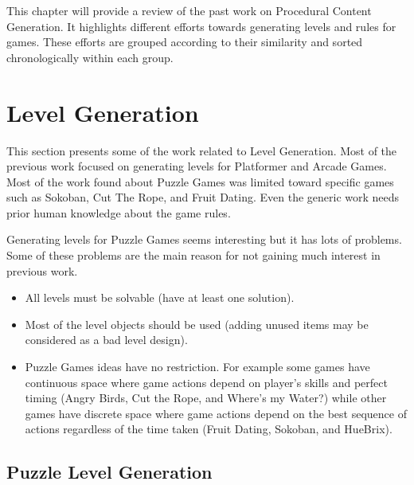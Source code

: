 This chapter will provide a review of the past work on Procedural Content Generation. It highlights different efforts towards generating levels and rules for games. These efforts are grouped according to their similarity and sorted chronologically within each group.

\section{Level Generation}
This section presents some of the work related to Level Generation. Most of the previous work focused on generating levels for Platformer and Arcade Games. Most of the work found about Puzzle Games was limited toward specific games such as Sokoban\cite{sokobanLevelGenerationNew, sokobanLevelGenerationOld}, Cut The Rope\cite{ctrSimulationApproach}, and Fruit Dating\cite{fruitDatingPCG}. Even the generic work needs prior human knowledge about the game rules\cite{ctrProgressiveApproach, ctrAutomaticGeneration}.\\\par

Generating levels for Puzzle Games seems interesting but it has lots of problems. Some of these problems are the main reason for not gaining much interest in previous work.
\begin{itemize} \itemsep0pt \parskip0pt 
	\item All levels must be solvable (have at least one solution).
	\item Most of the level objects should be used (adding unused items may be considered as a bad level design).
	\item Puzzle Games ideas have no restriction. For example some games have continuous space where game actions depend on player's skills and perfect timing (Angry Birds\cite{angryBirds}, Cut the Rope\cite{cutTheRope}, and Where's my Water?\cite{whereWater}) while other games have discrete space where game actions depend on the best sequence of actions regardless of the time taken (Fruit Dating\cite{fruitDating}, Sokoban\cite{sokoban}, and HueBrix\cite{hueBrix}).
\end{itemize}

\subsection{Puzzle Level Generation}

